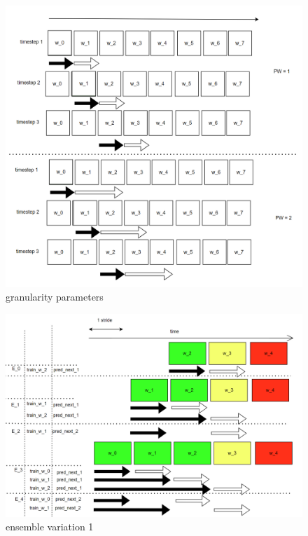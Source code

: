 \documentclass{IEEEtran}
\begin{document}
\begin{figure}[htbp]
\centering
\includegraphics[width=.9\linewidth]{./images/screenshot_20220321_130720.png}
\caption{\label{granularity parameters}granularity parameters}
\end{figure}


\begin{figure}[htbp]
\centering
\includegraphics[width=.9\linewidth]{./images/screenshot_20220321_124235.png}
\caption{\label{ensemble variation 1}ensemble variation 1}
\end{figure}
\end{document}
